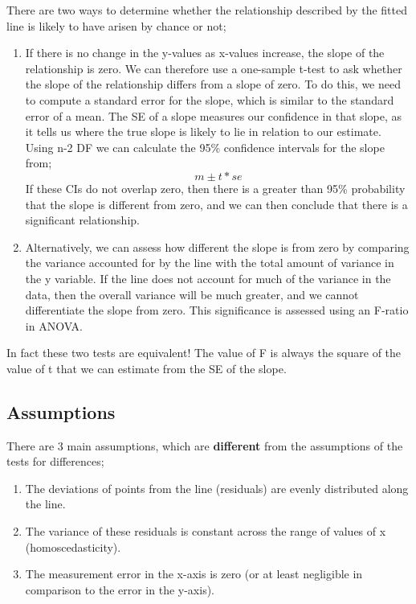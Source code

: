 \documentclass[
]{book}
\providecommand{\tightlist}{%
  \setlength{\itemsep}{0pt}\setlength{\parskip}{0pt}}
\begin{document}
There are two ways to determine whether the relationship described by the fitted line is likely to have arisen by chance or not;

\begin{enumerate}
\def\labelenumi{\arabic{enumi})}
\item
  If there is no change in the y-values as x-values increase, the slope of the relationship is zero. We can therefore use a one-sample t-test to ask whether the slope of the relationship differs from a slope of zero. To do this, we need to compute a standard error for the slope, which is similar to the standard error of a mean. The SE of a slope measures our confidence in that slope, as it tells us where the true slope is likely to lie in relation to our estimate. Using n-2 DF we can calculate the 95\% confidence intervals for the slope from;
  \[
  m ± t*se 
  \]
  If these CIs do not overlap zero, then there is a greater than 95\% probability that the slope is different from zero, and we can then conclude that there is a significant relationship.
\item
  Alternatively, we can assess how different the slope is from zero by comparing the variance accounted for by the line with the total amount of variance in the y variable. If the line does not account for much of the variance in the data, then the overall variance will be much greater, and we cannot differentiate the slope from zero. This significance is assessed using an F-ratio in ANOVA.
\end{enumerate}

In fact these two tests are equivalent! The value of F is always the square of the value of t that we can estimate from the SE of the slope.

\hypertarget{assumptions}{%
\subsection*{Assumptions}\label{assumptions}}

There are 3 main assumptions, which are \textbf{different} from the assumptions of the tests for differences;

\begin{enumerate}
\def\labelenumi{\arabic{enumi})}
\tightlist
\item
  The deviations of points from the line (residuals) are evenly distributed along the line.
\item
  The variance of these residuals is constant across the range of values of x (homoscedasticity).
\item
  The measurement error in the x-axis is zero (or at least negligible in comparison to the error in the y-axis).
\end{enumerate}
\end{document}

